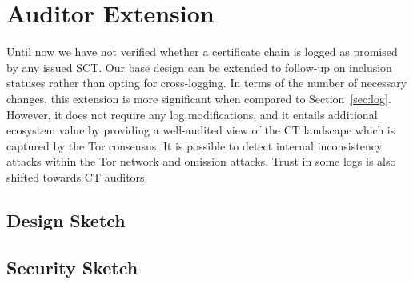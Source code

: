 \section{Auditor Extension} \label{sec:auditor}
Until now we have not verified whether a certificate chain is logged as promised
by any issued SCT.  Our base design can be extended to follow-up on inclusion
statuses rather than opting for cross-logging.  In terms of
the number of necessary changes, this extension is more significant when
compared to Section~\ref{sec:log}.  However, it does not require any log
modifications, and it entails additional ecosystem value by providing a
well-audited view of the CT landscape which is captured by the Tor consensus.
It is possible to detect internal inconsistency attacks within the Tor
network and omission attacks.  Trust in some logs is also shifted towards CT
auditors.

\subsection{Design Sketch}
\subsection{Security Sketch}

%
%

%
%

%

%
%
%
%

